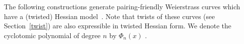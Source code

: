 The following constructions generate pairing-friendly Weierstrass curves
which have a (twisted) Hessian model~\cite[Section 5]{2015/hessian}.
Note that twists of these curves (see Section~\ref{twist}) are also expressible in twisted Hessian form.
We denote the cyclotomic polynomial of degree $n$ by $\Phi_{n}(x)$ .


